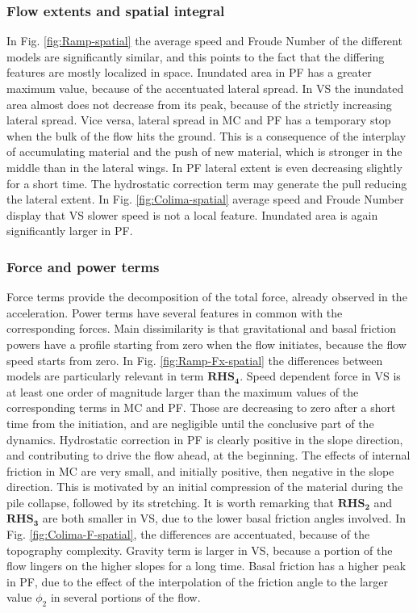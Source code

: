 \documentclass{article}
\begin{document}
\subsubsection{Flow extents and spatial integral}
In Fig. \ref{fig:Ramp-spatial} the average speed and Froude Number of the different models are significantly similar, and this points to the fact that the differing features are mostly localized in space. Inundated area in PF has a greater maximum value, because of the accentuated lateral spread. In VS the inundated area almost does not decrease from its peak, because of the strictly increasing lateral spread. Vice versa, lateral spread in MC and PF has a temporary stop when the bulk of the flow hits the ground. This is a consequence of the interplay of accumulating material and the push of new material, which is stronger in the middle than in the lateral wings. In PF lateral extent is even decreasing slightly for a short time. The hydrostatic correction term may generate the pull reducing the lateral extent. In Fig. \ref{fig:Colima-spatial} average speed and Froude Number display that VS slower speed is not a local feature. Inundated area is again significantly larger in PF.

\subsubsection{Force and power terms}
Force terms provide the decomposition of the total force, already observed in the acceleration. Power terms have several features in common with the corresponding forces. Main dissimilarity is that gravitational and basal friction powers have a profile starting from zero when the flow initiates, because the flow speed starts from zero. In Fig. \ref{fig:Ramp-Fx-spatial} the differences between models are particularly relevant in term  $\boldsymbol{RHS_4}$. Speed dependent force in VS is at least one order of magnitude larger than the maximum values of the corresponding terms in MC and PF. Those are decreasing to zero after a short time from the initiation, and are negligible until the conclusive part of the dynamics. Hydrostatic correction in PF is clearly positive in the slope direction, and contributing to drive the flow ahead, at the beginning. The effects of internal friction in MC are very small, and initially positive, then negative in the slope direction. This is motivated by an initial compression of the material during the pile collapse, followed by its stretching. It is worth remarking that $\boldsymbol{RHS_2}$ and $\boldsymbol{RHS_3}$ are both smaller in VS, due to the lower basal friction angles involved. In Fig. \ref{fig:Colima-F-spatial}, the differences are accentuated, because of the topography complexity. Gravity term is larger in VS, because a portion of the flow lingers on the higher slopes for a long time. Basal friction has a higher peak in PF, due to the effect of the interpolation of the friction angle to the larger value $\phi_2$ in several portions of the flow.
\end{document}
